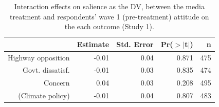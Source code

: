 \begin{table}[ht]
\centering
\caption{Interaction effects on salience as the DV, between the media
             treatment and respondents' wave 1 (pre-treatment) attitude on the each outcome (Study 1).} 
\label{tab:disruption_salience_bywave1}
\begin{tabular}{rrrrr}
  \hline
 & Estimate & Std. Error & Pr($>$$|$t$|$) & n \\ 
  \hline
Highway opposition & -0.01 & 0.04 & 0.871 & 475 \\ 
  Govt. dissatisf. & -0.01 & 0.03 & 0.835 & 474 \\ 
  Concern & 0.04 & 0.03 & 0.208 & 495 \\ 
  (Climate policy) & -0.01 & 0.04 & 0.807 & 483 \\ 
   \hline
\end{tabular}
\end{table}
